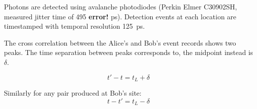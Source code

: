 \documentclass[aps,pra,onecolumn, superscriptaddress]{revtex4}
\begin{document}
Photons are detected using avalanche photodiodes (Perkin Elmer C30902SH, measured jitter time of 495 \textbf{error!} ps).
Detection events at each location are timestamped with temporal resolution 125~ps.


The cross correlation between the Alice's and Bob's event records shows two peaks. The time separation between peaks corresponds to, the midpoint instead is $\delta$.

\begin{equation}
t'-t=t_L + \delta
\end{equation}

Similarly for any pair produced at Bob's site:
\begin{equation}
t-t'=t_L - \delta
\end{equation}

\end{document}
